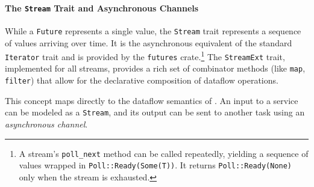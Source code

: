 \paragraph{The \texttt{Stream} Trait and Asynchronous Channels}
While a \texttt{Future} represents a single value, the \texttt{Stream} trait represents a
sequence of values arriving over time. It is the asynchronous equivalent of the standard
\texttt{Iterator} trait and is provided by the \texttt{futures} crate.\footnote{A stream's
    \texttt{poll\_next} method can be called repeatedly, yielding a sequence of values wrapped in
    \texttt{Poll::Ready(Some(T))}. It returns \texttt{Poll::Ready(None)} only when the stream is
    exhausted.} The \texttt{StreamExt} trait, implemented for all streams, provides a rich set of
combinator methods (like \texttt{map}, \texttt{filter}) that allow for the declarative composition
of dataflow operations.

This concept maps directly to the dataflow semantics of \GRust. An input to a service
can be modeled as a \texttt{Stream}, and its output can be sent to another task using an
\emph{asynchronous channel}.

